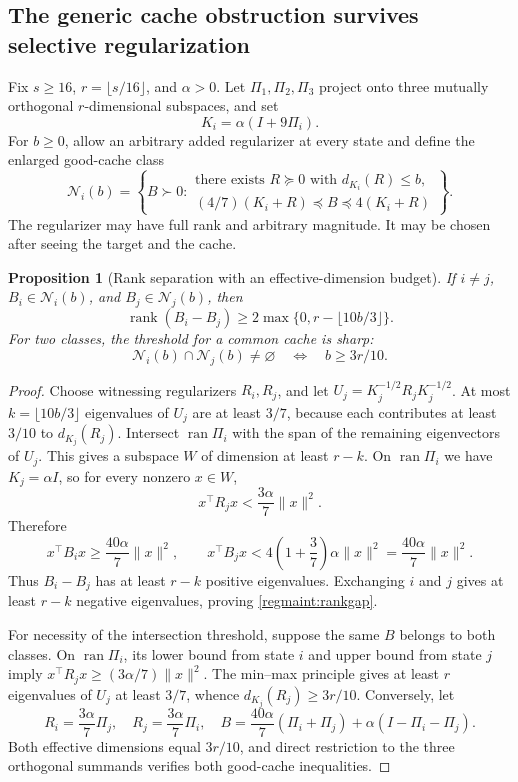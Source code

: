 \documentclass[11pt]{amsart}
\newtheorem{proposition}[theorem]{Proposition}
\theoremstyle{definition}\newtheorem{definition}[theorem]{Definition}
\theoremstyle{remark}\newtheorem{remark}[theorem]{Remark}
\numberwithin{equation}{section}
\begin{document}
\subsection{The generic cache obstruction survives selective regularization}

Fix $s\ge16$, $r=\lfloor s/16\rfloor$, and $\alpha>0$.  Let
$\Pi_1,\Pi_2,\Pi_3$ project onto three mutually orthogonal
$r$-dimensional subspaces, and set
\[
 K_i=\alpha(I+9\Pi_i).
\]
For $b\ge0$, allow an arbitrary added regularizer at every state and
define the enlarged good-cache class
\[
 \mathcal N_i(b)=\left\{B\succ0:
 \begin{array}{l}
 \text{there exists }R\succeq0\text{ with }d_{K_i}(R)\le b,\\[-2pt]
 (4/7)(K_i+R)\preceq B\preceq4(K_i+R)
 \end{array}\right\}.
\]
The regularizer may have full rank and arbitrary magnitude.  It may be
chosen after seeing the target and the cache.

\begin{proposition}[Rank separation with an effective-dimension budget]
\label{regmaint:separation}
If $i\ne j$, $B_i\in\mathcal N_i(b)$, and
$B_j\in\mathcal N_j(b)$, then
\begin{equation}\label{regmaint:rankgap}
 \operatorname{rank}(B_i-B_j)
 \ge2\max\{0,r-\lfloor10b/3\rfloor\}.
\end{equation}
For two classes, the threshold for a common cache is sharp:
\[
 \mathcal N_i(b)\cap\mathcal N_j(b)\ne\varnothing
 \quad\Longleftrightarrow\quad b\ge3r/10.
\]
\end{proposition}
\begin{proof}
Choose witnessing regularizers $R_i,R_j$, and let
$U_j=K_j^{-1/2}R_jK_j^{-1/2}$.  At most
$k=\lfloor10b/3\rfloor$ eigenvalues of $U_j$ are at least $3/7$,
because each contributes at least $3/10$ to $d_{K_j}(R_j)$.
Intersect $\operatorname{ran}\Pi_i$ with the span of the remaining
eigenvectors of $U_j$.  This gives a subspace $W$ of dimension at least
$r-k$.  On $\operatorname{ran}\Pi_i$ we have $K_j=\alpha I$, so for
every nonzero $x\in W$,
\[
 x^\top R_jx<\frac{3\alpha}{7}\|x\|^2.
\]
Therefore
\[
 x^\top B_ix\ge\frac{40\alpha}{7}\|x\|^2,
 \qquad
 x^\top B_jx<4\left(1+\frac37\right)\alpha\|x\|^2
 =\frac{40\alpha}{7}\|x\|^2.
\]
Thus $B_i-B_j$ has at least $r-k$ positive eigenvalues.  Exchanging
$i$ and $j$ gives at least $r-k$ negative eigenvalues, proving
\eqref{regmaint:rankgap}.

For necessity of the intersection threshold, suppose the same $B$
belongs to both classes.  On $\operatorname{ran}\Pi_i$, its lower
bound from state $i$ and upper bound from state $j$ imply
$x^\top R_jx\ge(3\alpha/7)\|x\|^2$.  The min--max principle gives
at least $r$ eigenvalues of $U_j$ at least $3/7$, whence
$d_{K_j}(R_j)\ge3r/10$.  Conversely, let
\[
 R_i=\frac{3\alpha}{7}\Pi_j,\quad
 R_j=\frac{3\alpha}{7}\Pi_i,\quad
 B=\frac{40\alpha}{7}(\Pi_i+\Pi_j)
    +\alpha(I-\Pi_i-\Pi_j).
\]
Both effective dimensions equal $3r/10$, and direct restriction to
the three orthogonal summands verifies both good-cache inequalities.
\end{proof}
\end{document}
